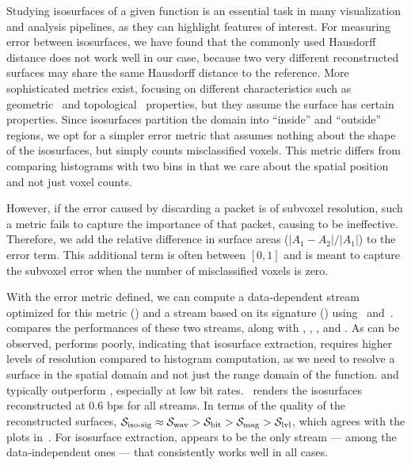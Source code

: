 Studying isosurfaces of a given function is an essential task in many visualization and analysis
pipelines, as they can highlight features of interest. For measuring error between isosurfaces, we
have found that the commonly used Hausdorff distance does not work well in our case, because two
very different reconstructed surfaces may share the same Hausdorff distance to the reference. More
sophisticated metrics exist, focusing on different characteristics such as
geometric~\cite{verifiable-isosurface} and topological~\cite{topology-verification-isosurface}
properties, but they assume the surface has certain properties. Since isosurfaces partition the
domain into ``inside'' and ``outside'' regions, we opt for a simpler error metric that assumes
nothing about the shape of the isosurfaces, but simply counts misclassified voxels. This metric
differs from comparing histograms with two bins in that we care about the spatial position and not
just voxel counts.

However, if the error caused by discarding a packet is of subvoxel resolution, such a metric fails
to capture the importance of that packet, causing \siop to be ineffective. Therefore, we add the
relative difference in surface areas ($|A_1-A_2|/|A_1|$) to the error term. This additional term is
often between $[0, 1]$ and is meant to capture the subvoxel error when the number of misclassified
voxels is zero.

With the error metric defined, we can compute a data-dependent stream optimized for this metric
(\siop) and a stream based on its signature (\sisg) using~
and~.  compares the performances of these two
streams, along with \sbit, \slvl, \swav, and \smag. As can be observed, \slvl performs poorly,
indicating that isosurface extraction, requires higher levels of resolution compared to histogram
computation, as we need to resolve a surface in the spatial domain and not just the range domain of
the function. \swav and \sisg typically outperform \sbit, especially at low bit
rates.~ renders the isosurfaces reconstructed at 0.6 bps for
all streams. In terms of the quality of the reconstructed surfaces, $\sisg \approx \swav > \sbit >
\smag > \slvl$, which agrees with the plots in~. For isosurface
extraction, \swav appears to be the only stream --- among the data-independent ones --- that
consistently works well in all cases.
